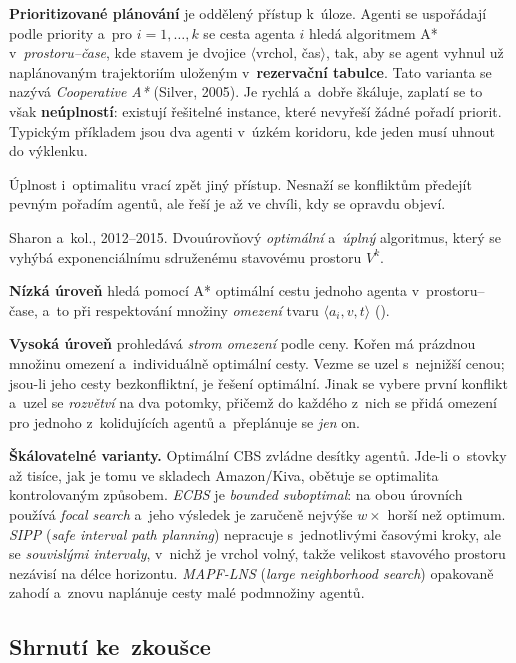 \documentclass[11pt,a4paper]{article}
\theoremstyle{definition}
\begin{document}
\textbf{Prioritizované plánování} je oddělený přístup k~úloze. Agenti se uspořádají podle
priority a~pro $i = 1,\dots,k$ se cesta agenta $i$ hledá algoritmem A* v~\emph{prostoru--čase},
kde stavem je dvojice $\langle$vrchol, čas$\rangle$, tak, aby se agent vyhnul už naplánovaným
trajektoriím uloženým v~\textbf{rezervační tabulce}. Tato varianta se nazývá \emph{Cooperative A*}
(Silver, 2005). Je rychlá a~dobře škáluje, zaplatí se to však \textbf{neúplností}: existují
řešitelné instance, které nevyřeší žádné pořadí priorit. Typickým příkladem jsou dva agenti
v~úzkém koridoru, kde jeden musí uhnout do výklenku.

Úplnost i~optimalitu vrací zpět jiný přístup. Nesnaží se konfliktům předejít pevným pořadím
agentů, ale řeší je až ve chvíli, kdy se opravdu objeví.

\begin{defbox}
Sharon a~kol., 2012--2015. Dvouúrovňový \emph{optimální} a~\emph{úplný} algoritmus, který se
vyhýbá exponenciálnímu sdruženému stavovému prostoru $V^k$.

\textbf{Nízká úroveň} hledá pomocí A* optimální cestu jednoho agenta v~prostoru--čase, a~to při
respektování množiny \emph{omezení} tvaru $\langle a_i, v, t\rangle$
().

\textbf{Vysoká úroveň} prohledává \emph{strom omezení} podle ceny. Kořen má prázdnou množinu
omezení a~individuálně optimální cesty. Vezme se uzel s~nejnižší cenou; jsou-li jeho cesty
bezkonfliktní, je řešení optimální. Jinak se vybere první konflikt a~uzel se \emph{rozvětví}
na dva potomky, přičemž do každého z~nich se přidá omezení pro jednoho z~kolidujících agentů
a~přeplánuje se \emph{jen} on.
\end{defbox}

\textbf{Škálovatelné varianty.} Optimální CBS zvládne desítky agentů. Jde-li o~stovky až tisíce,
jak je tomu ve skladech Amazon/Kiva, obětuje se optimalita kontrolovaným způsobem. \emph{ECBS} je
\emph{bounded suboptimal}: na obou úrovních používá \emph{focal search} a~jeho výsledek je
zaručeně nejvýše $w\times$ horší než optimum. \emph{SIPP} (\emph{safe interval path planning})
nepracuje s~jednotlivými časovými kroky, ale se \emph{souvislými intervaly}, v~nichž je vrchol
volný, takže velikost stavového prostoru nezávisí na délce horizontu. \emph{MAPF-LNS}
(\emph{large neighborhood search}) opakovaně zahodí a~znovu naplánuje cesty malé podmnožiny
agentů.

\subsection{Shrnutí ke~zkoušce}
\end{document}
